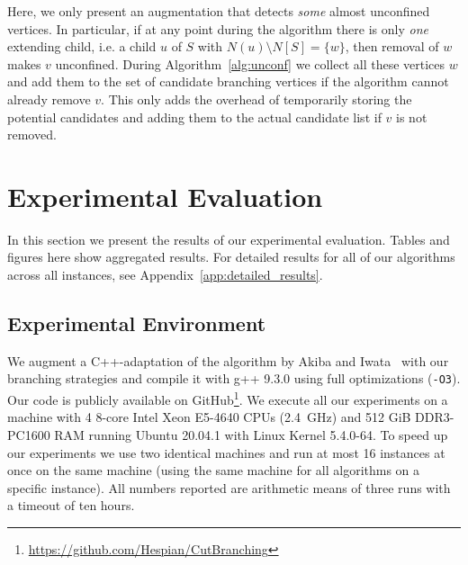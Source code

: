 \documentclass[a4paper,UKenglish,cleveref, autoref, thm-restate]{lipics-v2021}
\begin{document}
Here, we only present an augmentation that detects \emph{some} almost
unconfined vertices. In particular, if at any point during the algorithm there
is only \emph{one} extending child, i.e. a child $u$ of $S$ with $N(u)\setminus
N[S] = \{w\}$, then removal of $w$ makes $v$ unconfined. During
Algorithm~\ref{alg:unconf} we collect all these vertices $w$ and add them to the
set of candidate branching vertices if the algorithm cannot already remove $v$.
This only adds the overhead of temporarily storing the potential candidates and
adding them to the actual candidate list if $v$ is not removed.


\section{Experimental Evaluation}

In this section we present the results of our experimental evaluation. Tables
and figures here show aggregated results. For
detailed results for all of our algorithms across all instances, see Appendix~\ref{app:detailed_results}.

\subsection{Experimental Environment}
We augment a C++-adaptation of the algorithm by Akiba and
Iwata~\cite{AkibaIwata} with our branching strategies and compile it
with g++ 9.3.0 using full optimizations (\texttt{-O3}). Our
code is publicly available on GitHub\footnote{\url{https://github.com/Hespian/CutBranching}}. We execute all our experiments on a machine with 4 8-core Intel Xeon E5-4640 CPUs
(2.4~GHz) and 512 GiB DDR3-PC1600 RAM running Ubuntu 20.04.1 with Linux Kernel 5.4.0-64. To speed up our experiments we use two
identical machines and run at most 16 instances at once on the
same machine (using the same machine for all algorithms on a specific instance).
All numbers reported are arithmetic means of three runs with a timeout of ten
hours.
\end{document}

